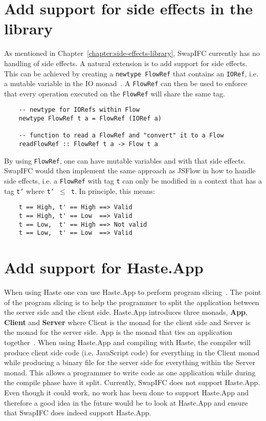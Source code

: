 \section{Add support for side effects in the library}
\label{chapter:future-side-effects}
As mentioned in Chapter~\ref{chapter:side-effects-library}, SwapIFC currently has no handling of side effects. A natural extension is to add support for side effects. This can be achieved by creating a {\tt newtype FlowRef} that contains an {\tt IORef}, i.e. a mutable variable in the IO monad~\cite{ioref}. A {\tt FlowRef} can then be used to enforce that every operation executed on the {\tt FlowRef} will share the same tag.
\begin{verbatim}
    -- newtype for IORefs within Flow
    newtype FlowRef t a = FlowRef (IORef a)

    -- function to read a FlowRef and "convert" it to a Flow
    readFlowRef :: FlowRef t a -> Flow t a
\end{verbatim}
By using {\tt FlowRef}, one can have mutable variables and with that side effects. SwapIFC would then implement the same approach as JSFlow in how to handle side effects, i.e. a {\tt FlowRef} with tag {\tt t} can only be modified in a context that has a tag {\tt t'} where {\tt t' \(\leq\) t}. In principle, this means:
\begin{verbatim}
    t == High, t' == High ==> Valid
    t == High, t' == Low  ==> Valid
    t == Low,  t' == High ==> Not valid
    t == Low,  t' == Low  ==> Valid
\end{verbatim}

\section{Add support for Haste.App}
\label{chapter:future-haste-app}
When using Haste one can use Haste.App to perform program slicing~\cite{haste-symposium}. The point of the program slicing is to help the programmer to split the application between the server side and the client side. Haste.App introduces three monads, \textbf{App}, \textbf{Client} and \textbf{Server} where Client is the monad for the client side and Server is the monad for the server side. App is the monad that ties an application together~\cite{haste-app}. When using Haste.App and compiling with Haste, the compiler will produce client side code (i.e. JavaScript code) for everything in the Client monad while producing a binary file for the server side for everything within the Server monad. This allows a programmer to write code as one application while during the compile phase have it split. Currently, SwapIFC does not support Haste.App. Even though it could work, no work has been done to support Haste.App and therefore a good idea in the future would be to look at Haste.App and ensure that SwapIFC does indeed support Haste.App.

